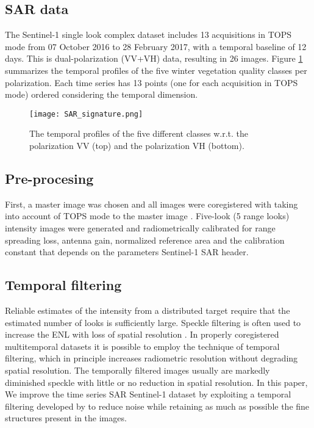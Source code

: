 \documentclass[journal, onecolumn]{IEEEtran}
\begin{document}
\subsection{SAR data }




The Sentinel-1 single look complex  dataset includes 13 acquisitions in TOPS mode from 07 October 2016 to 28 February 2017, with a temporal baseline of 12 days. This is dual-polarization (VV+VH) data, resulting in 26 images. Figure \ref{fig:sarSignature} summarizes the temporal profiles of the five winter vegetation quality classes per polarization. Each time series has 13 points (one for each acquisition in TOPS mode) ordered considering the temporal dimension. 


\begin{figure}[!ht]
\centering
\texttt{[image: SAR\_signature.png]}
\caption{The temporal profiles of the five different classes w.r.t. the polarization VV (top) and the polarization VH (bottom). \label{fig:sarSignature}}
\end{figure}


\subsection{Pre-procesing}

First, a master image was chosen and all images  were coregistered with taking into account of TOPS mode to the  master image \cite{6130599}.  Five-look (5 range looks) intensity  images were generated and radiometrically calibrated for range spreading loss, antenna gain, normalized reference area and the calibration constant that depends on the parameters Sentinel-1 SAR header.  

\subsection{Temporal filtering}

Reliable estimates of the intensity from a distributed target require that the estimated number of looks  is sufficiently large. Speckle filtering is often used to increase the ENL with loss of spatial resolution \cite{Quegan01}. In properly coregistered multitemporal datasets it is possible to employ the technique of temporal filtering, which in principle increases radiometric resolution without degrading spatial resolution.  The temporally filtered images usually are markedly diminished speckle with little or no reduction in spatial resolution. In this paper, We improve the time series SAR Sentinel-1 dataset by  exploiting a temporal filtering developed by \cite{Quegan01} to reduce noise while retaining as much as possible the fine structures present in the images. 
\end{document}
